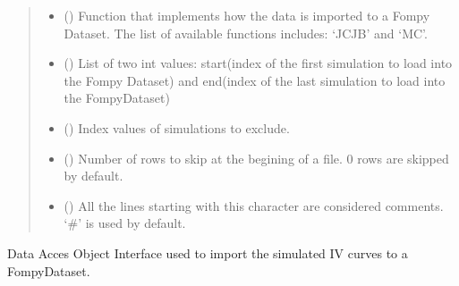\documentclass[letterpaper,10pt,english,openany, oneside]{sphinxmanual}
\begin{document}
\begin{fulllineitems}
\begin{fulllineitems}
\begin{quote}
\begin{description}
\begin{itemize}
\item {} 
 () \textendash{} Function that implements how the data is imported to a Fompy Dataset. The list of available functions includes:
‘JCJB’ and ‘MC’.

\item {} 
 () \textendash{} List of two int values: start(index of the first simulation to load into the Fompy Dataset)
and end(index of the last simulation to load into the FompyDataset)

\item {} 
 () \textendash{} Index values of simulations to exclude.

\item {} 
 () \textendash{} Number of rows to skip at the begining of a file. 0 rows are skipped by default.

\item {} 
 () \textendash{} All the lines starting with this character are considered comments.
‘\#’ is used by default.

\end{itemize}

\end{description}\end{quote}

\end{fulllineitems}


\end{fulllineitems}


\begin{fulllineitems}
\label{\detokenize{index:fompy.fds.dataDAO}}
Data Acces Object Interface used to import the simulated IV curves to a FompyDataset.

\end{fulllineitems}

\end{document}
